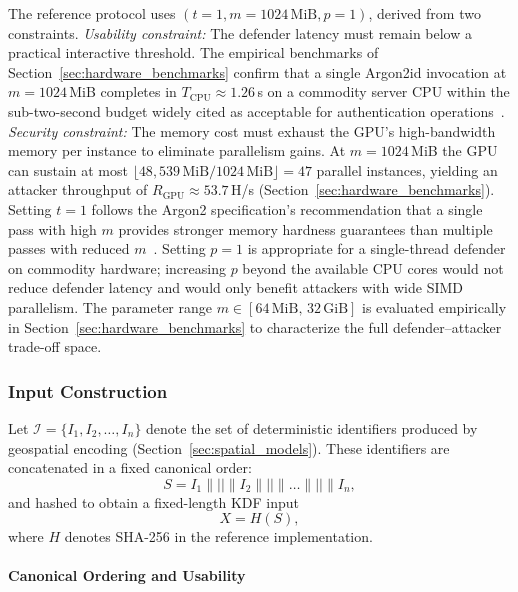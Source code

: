 \documentclass[mathematics,article,accept,pdftex,moreauthors]{Definitions/mdpi}
\begin{document}
{The reference protocol uses $(t=1, m=1024\,\text{MiB}, p=1)$, derived from two constraints. \emph{Usability constraint:} The defender latency must remain below a practical interactive threshold. The empirical benchmarks of Section~\ref{sec:hardware_benchmarks} confirm that a single Argon2id invocation at $m=1024$\,MiB completes in $T_\text{CPU} \approx 1.26$\,s on a commodity server CPU within the sub-two-second budget widely cited as acceptable for authentication operations~\cite{nielsen1994usability}. \emph{Security constraint:} The memory cost must exhaust the GPU's high-bandwidth memory per instance to eliminate parallelism gains. At $m=1024$\,MiB the GPU can sustain at most $\lfloor 48{,}539\,\text{MiB}/1024\,\text{MiB} \rfloor = 47$ parallel instances, yielding an attacker throughput of $R_\text{GPU} \approx 53.7$\,H/s (Section~\ref{sec:hardware_benchmarks}).
Setting $t=1$ follows the Argon2 specification's recommendation that a single pass with high $m$ provides stronger memory hardness guarantees than multiple passes with reduced $m$~\cite{7467361}. Setting $p=1$ is appropriate for a single-thread defender on commodity hardware; increasing $p$ beyond the available CPU cores would not reduce defender latency and would only benefit attackers with wide SIMD parallelism. The parameter range $m \in [64\,\text{MiB},\, 32\,\text{GiB}]$ is evaluated empirically in Section~\ref{sec:hardware_benchmarks} to characterize the full defender--attacker trade-off space.}

\subsubsection{Input Construction}

Let $\mathcal{I} = \{I_1, I_2, \dots, I_n\}$ denote the set of deterministic identifiers produced by geospatial encoding (Section~\ref{sec:spatial_models}). These identifiers are concatenated in a fixed canonical order:
\begin{equation}
S = I_1 \parallel \texttt{||} \parallel I_2 \parallel \texttt{||} \parallel \dots \parallel \texttt{||} \parallel I_n ,
\label{eq:spatial_concat}
\end{equation}
and hashed to obtain a fixed-length KDF input
\begin{equation}
X = H(S),
\label{eq:spatial_hash}
\end{equation}
where $H$ denotes SHA-256 in the reference implementation.

\paragraph*{Canonical Ordering and Usability} 
\end{document}
